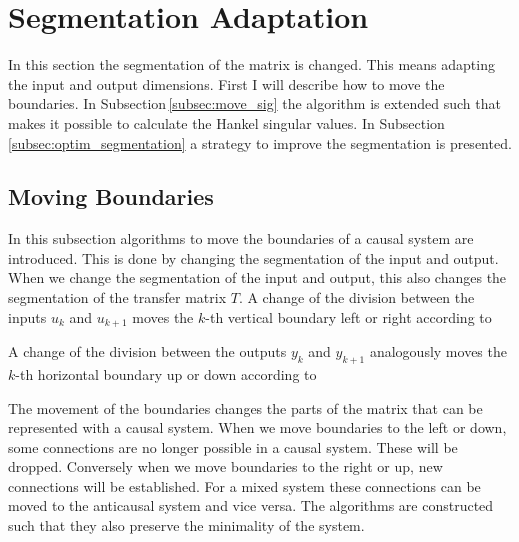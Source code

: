 \documentclass[doctype=mastersthesis,BCOR=15mm,biblatex]{ldvbook}%
\newcommand{\m}{\triangledown} %
\begin{document}
\section{Segmentation Adaptation}\label{sec:Segmentation}

In this section the segmentation of the matrix is changed. 
This means adapting the input and output dimensions. 
First I will describe how to move the boundaries.
In Subsection\,\ref{subsec:move_sig} the algorithm is extended such that makes it possible to calculate the Hankel singular values.
In Subsection\,\ref{subsec:optim_segmentation} a strategy to improve the segmentation is presented.

\subsection{Moving Boundaries}\label{subsec:move}
In this subsection algorithms to move the boundaries of a causal system are introduced.
This is done by changing the segmentation of the input and output.
When we change the segmentation of the input and output, this also changes the segmentation of the transfer matrix $T$.
A change of the division between the inputs $u_k$ and $u_{k+1}$ moves the $k$-th vertical boundary left or right according to

A change of the division between the outputs $y_k$ and $y_{k+1}$ analogously moves the $k$-th horizontal boundary up or down according to

The movement of the boundaries changes the parts of the matrix that can be represented with a causal system.
When we move boundaries to the left or down, some connections are no longer possible in a causal system. These will be dropped.
Conversely when we move boundaries to the right or up, new connections will be established.
For a mixed system these connections can be moved to the anticausal system and vice versa.
The algorithms are constructed such that they also preserve the minimality of the system.%
\end{document}
